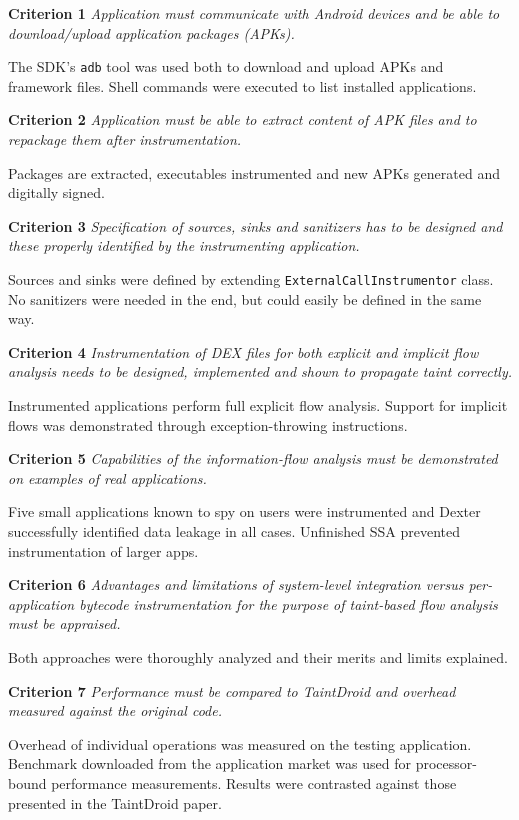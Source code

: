 \documentclass[12pt,twoside,notitlepage]{report}
\begin{document}
\begin{description}
	\item \textbf{Criterion 1} \emph{Application must communicate with Android devices and be able to download/upload application packages (APKs).}

	The SDK's \texttt{adb} tool was used both to download and upload APKs and framework files. Shell commands were executed to list installed applications.
	\item \textbf{Criterion 2} \emph{Application must be able to extract content of APK files and to repackage them after instrumentation.}

	Packages are extracted, executables instrumented and new APKs generated and digitally signed.

	\item \textbf{Criterion 3} \emph{Specification of sources, sinks and sanitizers has to be designed and these properly identified by the instrumenting application.}

	Sources and sinks were defined by extending \verb$ExternalCallInstrumentor$ class. No sanitizers were needed in the end, but could easily be defined in the same way.

	\item \textbf{Criterion 4} \emph{Instrumentation of DEX files for both explicit and implicit flow analysis needs to be designed, implemented and shown to propagate taint correctly.}

	Instrumented applications perform full explicit flow analysis. Support for implicit flows was demonstrated through exception-throwing instructions.

	\item \textbf{Criterion 5} \emph{Capabilities of the information-flow analysis must be demonstrated on examples of real applications.}

	Five small applications known to spy on users were instrumented and Dexter successfully identified data leakage in all cases. Unfinished SSA prevented instrumentation of larger apps.

	\newpage

	\item \textbf{Criterion 6} \emph{Advantages and limitations of system-level integration versus per-application bytecode instrumentation for the purpose of taint-based flow analysis must be appraised.}

	Both approaches were thoroughly analyzed and their merits and limits explained.

	\item \textbf{Criterion 7} \emph{Performance must be compared to TaintDroid and overhead measured against the original code.}

	Overhead of individual operations was measured on the testing application. Benchmark downloaded from the application market was used for processor-bound performance measurements. Results were contrasted against those presented in the TaintDroid paper.
\end{description}
\end{document}
